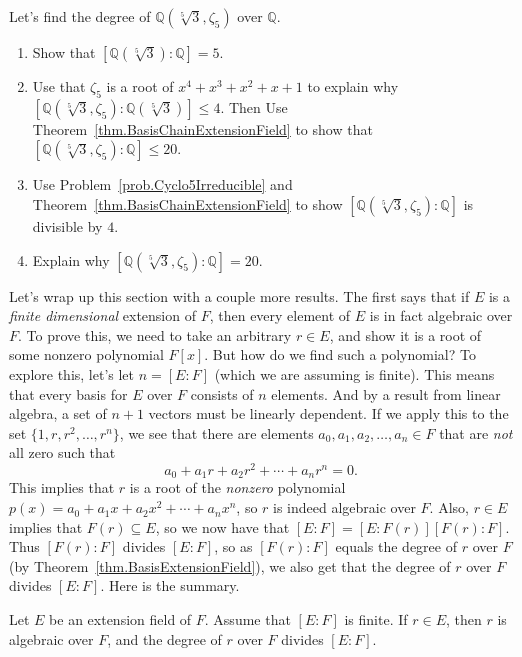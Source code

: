 
\begin{problem}\label{prob.DegreeQFifthRoot3AndZeta5}
Let's find the degree of $\mathbb{Q}(\sqrt[5]{3},\zeta_5)$ over $\mathbb{Q}$.
\begin{enumerate}
\item Show that $[\mathbb{Q}(\sqrt[5]{3}):\mathbb{Q}] = 5$.
\item Use that $\zeta_5$ is a root of $x^4+x^3+x^2+x+1$ to explain why $[\mathbb{Q}(\sqrt[5]{3},\zeta_5):\mathbb{Q}(\sqrt[5]{3})] \le 4$. Then Use Theorem~\ref{thm.BasisChainExtensionField} to show that $[\mathbb{Q}(\sqrt[5]{3},\zeta_5):\mathbb{Q}]\le 20$.
\item Use Problem~\ref{prob.Cyclo5Irreducible} and Theorem~\ref{thm.BasisChainExtensionField}  to show $[\mathbb{Q}(\sqrt[5]{3},\zeta_5):\mathbb{Q}]$ is divisible by $4$.
\item Explain why $[\mathbb{Q}(\sqrt[5]{3},\zeta_5):\mathbb{Q}]= 20.$
\end{enumerate}
\end{problem}

Let's wrap up this section with a couple more results. The first says that if $E$ is a \emph{finite dimensional} extension of $F$, then every element of $E$ is in fact algebraic over $F$. To prove this, we need to take an arbitrary $r\in E$, and show it is a root of some nonzero polynomial $F[x]$. But how do we find such a polynomial? To explore this, let's let $n= [E:F]$ (which we are assuming is finite). This means that every basis for $E$ over $F$ consists of $n$ elements. And by a result from  linear algebra, a set of $n+1$ vectors must be linearly dependent. If we apply this to the set $\{1,r,r^2,\ldots,r^n\}$, we see that there are elements $a_0,a_1,a_2,\ldots,a_n\in F$ that are \emph{not} all zero such that \[a_0+a_1r+a_2r^2+\cdots+a_nr^n = 0.\]
This implies that $r$ is a root of the \emph{nonzero} polynomial $p(x) = a_0+a_1x+a_2x^2+\cdots+a_nx^n$, so $r$ is indeed algebraic over $F$. Also, $r\in E$ implies that $F(r)\subseteq E$, so we now have that $[E:F] = [E:F(r)][F(r):F]$. Thus $[F(r):F]$ divides $[E:F]$, so as $[F(r):F]$ equals the degree of $r$ over $F$ (by Theorem~\ref{thm.BasisExtensionField}), we also get that the degree of $r$ over $F$ divides $[E:F]$. Here is the summary.

\begin{fact}
Let $E$ be an extension field of $F$. Assume that $[E:F]$ is finite. If $r\in E$, then $r$ is algebraic over $F$, and the degree of $r$ over $F$ divides $[E:F]$.
\end{fact}

